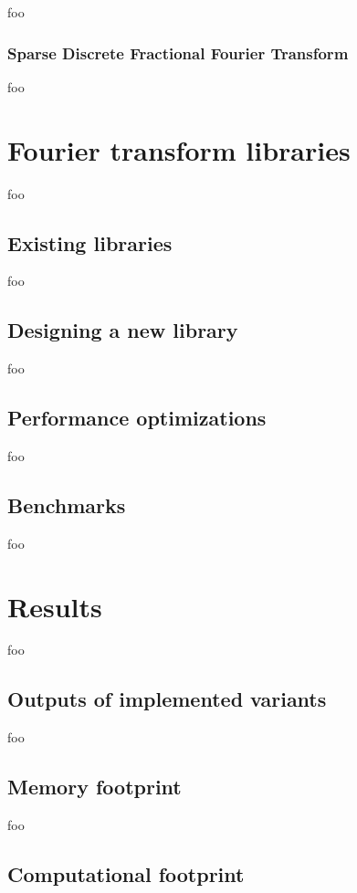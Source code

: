 \documentclass[letter,12pt,notitlepage]{article}
\begin{document}
foo

\subsubsection{Sparse Discrete Fractional Fourier Transform}

foo

\section{Fourier transform libraries}

foo

\subsection{Existing libraries}

foo

\subsection{Designing a new library}

foo

\subsection{Performance optimizations}

foo

\subsection{Benchmarks}

foo

\section{Results}

foo

\subsection{Outputs of implemented variants}

foo

\subsection{Memory footprint}

foo

\subsection{Computational footprint}
\end{document}
